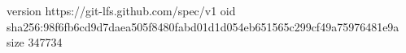version https://git-lfs.github.com/spec/v1
oid sha256:98f6fb6cd9d7daea505f8480fabd01d1d054eb651565c299cf49a75976481e9a
size 347734
